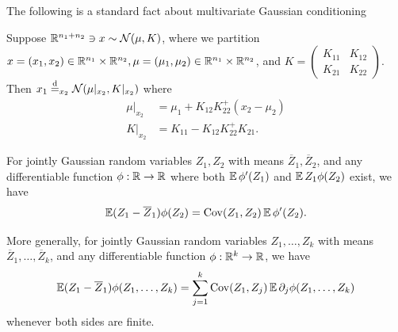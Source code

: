 \documentclass[main.tex]{subfiles}
\begin{document}
The following is a standard fact about multivariate Gaussian conditioning
\begin{prop}\label{prop:GaussianCondition}
Suppose $\mathbb{R}^{n_1 + n_2} \ni x \sim \mathcal{N}(\mu, K)$, where we partition $x = (x_1, x_2) \in \mathbb{R}^{n_1} \times \mathbb{R}^{n_2}, \mu = (\mu_1, \mu_2) \in \mathbb{R}^{n_1} \times \mathbb{R}^{n_2}$, and $K = \begin{pmatrix} K_{11} & K_{12}\\ K_{21} & K_{22}\end{pmatrix}$.
Then
$x_1 \overset{\mathrm{d}}{=}_{x_2} \mathcal{N}(\mu|_{x_2}, K|_{x_2})$
where
\begin{align*}
    \mu|_{x_2}
        &=
            \mu_1 + K_{12} K_{22}^+ (x_2 - \mu_2)\\
    K|_{x_2}
        &=
            K_{11} - K_{12} K_{22}^+ K_{21}.
\end{align*}

\end{prop}

\begin{lemma}\label{lemma:stein}
For jointly Gaussian random variables $Z_1, Z_2$ with means $\overline Z_1, \overline Z_2$, and any differentiable function $\phi: \mathbb{R} \to \mathbb{R}$ where both $\operatorname*{\mathbb{E}} \phi'(Z_1)$ and $\operatorname*{\mathbb{E}} Z_1 \phi(Z_2)$ exist, we have
\[\operatorname*{\mathbb{E}} (Z_1 - \overline Z_1) \phi(Z_2) = \operatorname{Cov}(Z_1, Z_2) \operatorname*{\mathbb{E}} \phi'(Z_2).\]

More generally, for jointly Gaussian random variables $Z_1,\ldots, Z_k$ with means $\overline Z_1, \ldots, \overline Z_k$, and any differentiable function $\phi: \mathbb{R}^k \to \mathbb{R}$, we have
\[\operatorname*{\mathbb{E}} (Z_1 - \overline Z_1) \phi(Z_1, \ldots, Z_k) =
\sum_{j=1}^k \operatorname{Cov}(Z_1, Z_j) \operatorname*{\mathbb{E}} \partial_j \phi(Z_1, \ldots, Z_k)\]
whenever both sides are finite.
\end{lemma}
\end{document}
